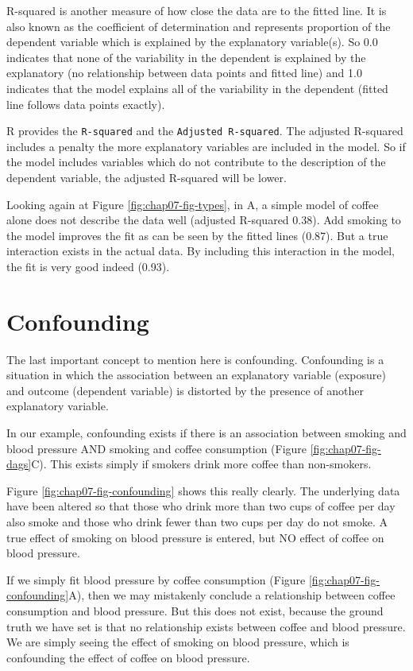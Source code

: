 \documentclass[12pt,]{krantz}
\theoremstyle{definition}
\theoremstyle{definition}
\theoremstyle{definition}
\theoremstyle{remark}
\begin{document}
R-squared is another measure of how close the data are to the fitted
line. It is also known as the coefficient of determination and
represents proportion of the dependent variable which is explained by
the explanatory variable(s). So 0.0 indicates that none of the
variability in the dependent is explained by the explanatory (no
relationship between data points and fitted line) and 1.0 indicates that
the model explains all of the variability in the dependent (fitted line
follows data points exactly).

R provides the \texttt{R-squared} and the \texttt{Adjusted\ R-squared}.
The adjusted R-squared includes a penalty the more explanatory variables
are included in the model. So if the model includes variables which do
not contribute to the description of the dependent variable, the
adjusted R-squared will be lower.

Looking again at Figure \ref{fig:chap07-fig-types}, in A, a simple model
of coffee alone does not describe the data well (adjusted R-squared
0.38). Add smoking to the model improves the fit as can be seen by the
fitted lines (0.87). But a true interaction exists in the actual data.
By including this interaction in the model, the fit is very good indeed
(0.93).

\hypertarget{confounding}{%
\section{Confounding}\label{confounding}}

The last important concept to mention here is confounding. Confounding
is a situation in which the association between an explanatory variable
(exposure) and outcome (dependent variable) is distorted by the presence
of another explanatory variable.

In our example, confounding exists if there is an association between
smoking and blood pressure AND smoking and coffee consumption (Figure
\ref{fig:chap07-fig-dags}C). This exists simply if smokers drink more
coffee than non-smokers.

Figure \ref{fig:chap07-fig-confounding} shows this really clearly. The
underlying data have been altered so that those who drink more than two
cups of coffee per day also smoke and those who drink fewer than two
cups per day do not smoke. A true effect of smoking on blood pressure is
entered, but NO effect of coffee on blood pressure.

If we simply fit blood pressure by coffee consumption (Figure
\ref{fig:chap07-fig-confounding}A), then we may mistakenly conclude a
relationship between coffee consumption and blood pressure. But this
does not exist, because the ground truth we have set is that no
relationship exists between coffee and blood pressure. We are simply
seeing the effect of smoking on blood pressure, which is confounding the
effect of coffee on blood pressure.
\end{document}
